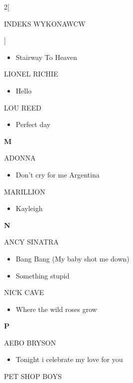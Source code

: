 \documentclass[a4paper]{report}
\begin{document}
\begin{multicols*}{2}[\begin{Huge}INDEKS WYKONAWCW\end{Huge}\vspace{1cm}]
\begin{itemize}[topsep=0pt]
\itemsep0em
\item[]  Stairway To Heaven   \\
\end{itemize}
 LIONEL RICHIE 
\begin{itemize}[topsep=0pt]
\itemsep0em
\item[]  Hello   \\
\end{itemize}
 LOU REED 
\begin{itemize}[topsep=0pt]
\itemsep0em
\item[]  Perfect day   \\
\end{itemize}
 \begin{Large}\textbf{M}\end{Large}ADONNA 
\begin{itemize}[topsep=0pt]
\itemsep0em
\item[]  Don't cry for me Argentina   \\
\end{itemize}
 MARILLION 
\begin{itemize}[topsep=0pt]
\itemsep0em
\item[]  Kayleigh   \\
\end{itemize}
 \begin{Large}\textbf{N}\end{Large}ANCY SINATRA 
\begin{itemize}[topsep=0pt]
\itemsep0em
\item[]  Bang Bang (My baby shot me down)   \\
\item[]  Something stupid   \\
\end{itemize}
 NICK CAVE 
\begin{itemize}[topsep=0pt]
\itemsep0em
\item[]  Where the wild roses grow   \\
\end{itemize}
 \begin{Large}\textbf{P}\end{Large}AEBO BRYSON 
\begin{itemize}[topsep=0pt]
\itemsep0em
\item[]  Tonight i celebrate my love for you   \\
\end{itemize}
 PET SHOP BOYS 
\begin{itemize}[topsep=0pt]

\end{itemize}
\end{multicols*}
\end{document}
